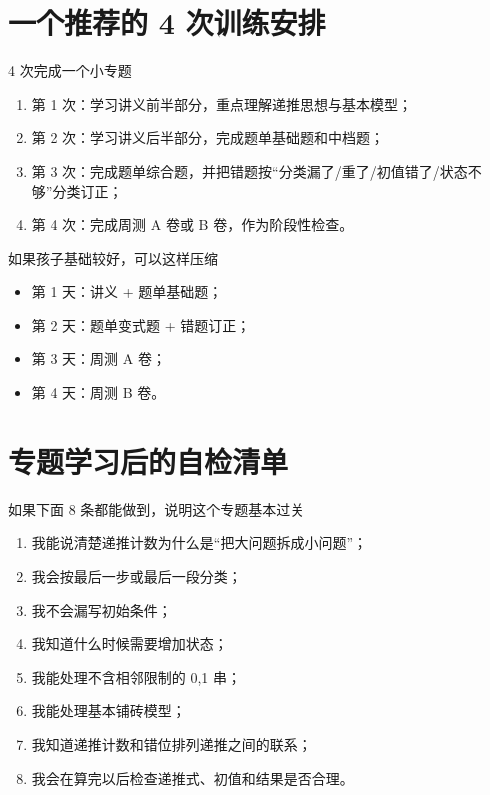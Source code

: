 \documentclass[11pt,a4paper,fontset=fandol]{ctexart}
\begin{document}
\section{一个推荐的 4 次训练安排}

\begin{goalbox}{4 次完成一个小专题}
\begin{enumerate}
  \item 第 1 次：学习讲义前半部分，重点理解递推思想与基本模型；
  \item 第 2 次：学习讲义后半部分，完成题单基础题和中档题；
  \item 第 3 次：完成题单综合题，并把错题按“分类漏了/重了/初值错了/状态不够”分类订正；
  \item 第 4 次：完成周测 A 卷或 B 卷，作为阶段性检查。
\end{enumerate}
\end{goalbox}

\begin{infobox}{如果孩子基础较好，可以这样压缩}
\begin{itemize}
  \item 第 1 天：讲义 + 题单基础题；
  \item 第 2 天：题单变式题 + 错题订正；
  \item 第 3 天：周测 A 卷；
  \item 第 4 天：周测 B 卷。
\end{itemize}
\end{infobox}

\section{专题学习后的自检清单}

\begin{goalbox}{如果下面 8 条都能做到，说明这个专题基本过关}
\begin{enumerate}
  \item 我能说清楚递推计数为什么是“把大问题拆成小问题”；
  \item 我会按最后一步或最后一段分类；
  \item 我不会漏写初始条件；
  \item 我知道什么时候需要增加状态；
  \item 我能处理不含相邻限制的 0,1 串；
  \item 我能处理基本铺砖模型；
  \item 我知道递推计数和错位排列递推之间的联系；
  \item 我会在算完以后检查递推式、初值和结果是否合理。
\end{enumerate}
\end{goalbox}
\end{document}
